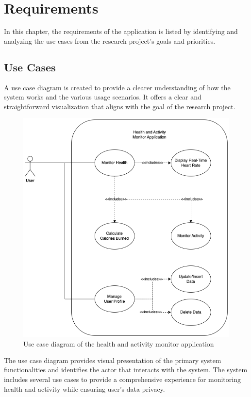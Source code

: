 \section{Requirements}
In this chapter, the requirements of the application is listed by identifying and analyzing the use cases from the research project's goals and priorities.

\subsection{Use Cases}
A use case diagram is created to provide a clearer understanding of how the system works and the various usage scenarios. It offers a clear and straightforward visualization that aligns with the goal of the research project.
\begin{figure}[H]
    \centering
    \includegraphics[width=1\textwidth]{diagrams/usecase.drawio.png}
    \caption{Use case diagram of the health and activity monitor application}
    \label{fig:use_cases}
\end{figure}
\newpage
The use case diagram provides visual presentation of the primary system functionalities and identifies the actor that interacts with the system.
The system includes several use cases to provide a comprehensive experience for monitoring health and activity while ensuring user's data privacy.

